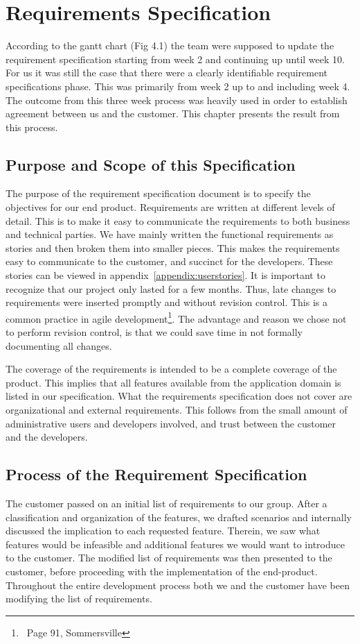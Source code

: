 \chapter{Requirements Specification}
According to the gantt chart (Fig 4.1) the team were supposed to update the
requirement specification starting from week 2 and continuing up until week
10. For us it was still the case that there were a clearly identifiable
requirement specifications phase. This was primarily from week 2 up to and
including week 4. The outcome from this three week process was heavily used in
order to establish agreement between us and the customer. This chapter
presents the result from this process. 

\section{Purpose and Scope of this Specification}
The purpose of the requirement specification document is to specify the
objectives for our end product. Requirements are written at different
levels of detail. This is to make it easy to communicate the requirements to
both business and technical parties. We have mainly written the functional
requirements as stories and then broken them into smaller pieces. This makes
the requirements easy to communicate to the customer, and succinct for the
developers. These stories can be viewed in appendix~\ref{appendix:userstories}. It is important to
recognize that our project only lasted for a few months. Thus, late changes
to requirements were inserted promptly and without revision control. This is
a common practice in agile development\footnote{\ Page 91, Sommersville}.
The advantage and reason we chose not to perform revision control, is that we
could save time in not formally documenting all changes.

The coverage of the requirements is intended to be a complete coverage
of the product. This implies that all features available from the
application domain is listed in our specification. What the requirements
specification does not cover are organizational and external requirements. This
follows from the small amount of administrative users and developers involved,
and trust between the customer and the developers.

\section{Process of the Requirement Specification}
The customer passed on an initial list of requirements to our group. After a
classification and organization of the features, we drafted scenarios and
internally discussed the implication to each requested feature. Therein, we saw
what features would be infeasible and additional features we would want to
introduce to the customer. The modified list of requirements was then presented
to the customer, before proceeding with the implementation of the end-product.
Throughout the entire development process both we and the customer have been
modifying the list of requirements.

